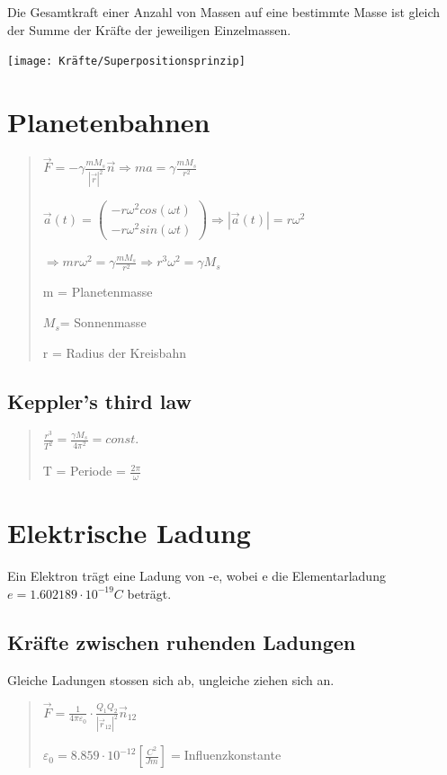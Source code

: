 Die Gesamtkraft einer Anzahl von Massen auf eine bestimmte Masse ist
gleich der Summe der Kräfte der jeweiligen Einzelmassen.

\texttt{[image: Kräfte/Superpositionsprinzip]}


\section*{Planetenbahnen}
\begin{verse}
$\vec{F}=-\gamma\frac{mM_{s}}{|\vec{r}|^{2}}\vec{n}\Rightarrow ma=\gamma\frac{mM_{s}}{r^{2}}$

$\vec{a}(t)=\left(\begin{array}{c}
-r\omega^{2}cos(\omega t)\\
-r\omega^{2}sin(\omega t)
\end{array}\right)\Rightarrow|\vec{a}(t)|=r\omega^{2}$

$\Rightarrow mr\omega^{2}=\gamma\frac{mM_{s}}{r^{2}}\Rightarrow r^{3}\omega^{2}=\gamma M_{s}$

m = Planetenmasse

$M_{s}$= Sonnenmasse

r = Radius der Kreisbahn
\end{verse}

\subsection*{Keppler's third law}
\begin{verse}
$\frac{r^{3}}{T^{2}}=\frac{\gamma M_{s}}{4\pi^{2}}=const.$

T = Periode = $\frac{2\pi}{\omega}$
\end{verse}

\section*{Elektrische Ladung}

Ein Elektron trägt eine Ladung von -e, wobei e die Elementarladung
$e=1.602189\cdot10^{-19}C$ beträgt.


\subsection*{Kräfte zwischen ruhenden Ladungen}

Gleiche Ladungen stossen sich ab, ungleiche ziehen sich an.
\begin{verse}
$\vec{F}=\frac{1}{4\pi\varepsilon_{0}}\cdot\frac{Q_{1}Q_{2}}{|\vec{r}_{12}|^{2}}\vec{n}_{12}$

$\varepsilon_{0}=8.859\cdot10^{-12}\left[\frac{C^{2}}{Jm}\right]=$Influenzkonstante
\end{verse}

